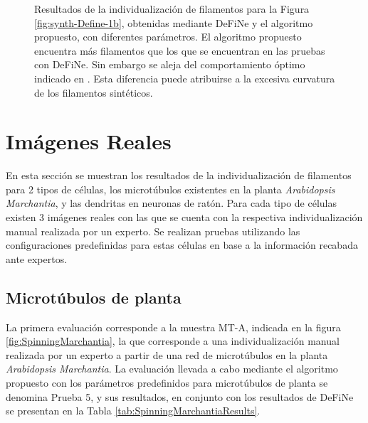 \begin{figure}[h!]
    \caption{Resultados de la individualizaci\'on de filamentos para la Figura \ref{fig:synth-Define-1b}, obtenidas mediante DeFiNe y el algoritmo propuesto, con diferentes par\'ametros. El algoritmo propuesto encuentra m\'as filamentos que los que se encuentran en las pruebas con DeFiNe. Sin embargo se aleja del comportamiento \'optimo indicado en \cite{breuer2015define}. Esta diferencia puede atribuirse a la excesiva curvatura de los filamentos sint\'eticos.}
    \label{fig:SynthDefine-Result}
\end{figure}
\clearpage
\newpage

\section{Im\'agenes Reales}

En esta secci\'on se muestran los resultados de la individualizaci\'on de filamentos para 2 tipos de c\'elulas, los microt\'ubulos existentes en la planta {\it Arabidopsis Marchantia}, y las dendritas en neuronas de rat\'on. Para cada tipo de c\'elulas existen 3 im\'agenes reales con las que se cuenta con la respectiva individualizaci\'on manual realizada por un experto. Se realizan pruebas utilizando las configuraciones predefinidas para estas c\'elulas en base a la informaci\'on recabada ante expertos.

\subsection{Microt\'ubulos de planta}
\label{subsec:mtTest}


La primera evaluaci\'on corresponde a la muestra MT-A, indicada en la figura \ref{fig:SpinningMarchantia}, la que corresponde a una individualizaci\'on manual realizada por un experto a partir de una red de microt\'ubulos en la planta {\it Arabidopsis Marchantia}. La evaluaci\'on llevada a cabo mediante el algoritmo propuesto con los par\'ametros predefinidos para microt\'ubulos de planta se denomina Prueba 5, y sus resultados, en conjunto con los resultados de DeFiNe se presentan en la Tabla \ref{tab:SpinningMarchantiaResults}.

